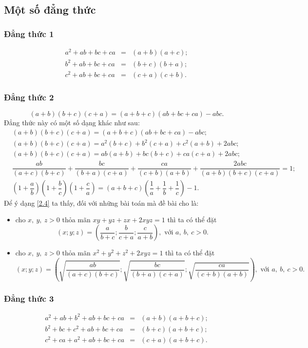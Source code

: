 {\subsection{Một số đẳng thức}
\subsubsection{Đẳng thức 1}
\begin{eqnarray*}
	a^{2}+ab+bc+ca&=&(a+b)(a+c);\\
	b^{2}+ab+bc+ca&=&(b+c)(b+a);\\
	c^{2}+ab+bc+ca&=&(c+a)(c+b).
\end{eqnarray*}
\subsubsection{Đẳng thức 2}
\[ 
(a+b)(b+c)(c+a)=(a+b+c)(ab+bc+ca)-abc.
\]
Đẳng thức này có một số dạng khác như sau:
\begin{align}
&(a+b)(b+c)(c+a)=(a+b+c)(ab+bc+ca)-abc;\tag{2.1}\\
&(a+b)(b+c)(c+a)=a^{2}(b+c)+b^{2}(c+a)+c^{2}(a+b)+2abc;\tag{2.2}\\
&(a+b)(b+c)(c+a)=ab(a+b)+bc(b+c)+ca(c+a)+2abc;\tag{2.3}\\
&\dfrac{ab}{(a+c)(b+c)}+\dfrac{bc}{(b+a)(c+a)}+\dfrac{ca}{(c+b)(a+b)}+\dfrac{2abc}{(a+b)(b+c)(c+a)}=1;\label{2.4}\tag{2.4}\\
&\left(1+\dfrac{a}{b}\right)\left(1+\dfrac{b}{c}\right)\left(1+\dfrac{c}{a}\right)=(a+b+c)\left(\dfrac{1}{a}+\dfrac{1}{b}+\dfrac{1}{c}\right)-1.\tag{2.5}
\end{align}
Để ý dạng \eqref{2.4} ta thấy, đối với những bài toán mà đề bài cho là:
\begin{itemize}
	\item cho $ x,\ y,\ z>0 $ thỏa mãn $ xy+yz+zx+2xyz=1 $ thì ta có thể đặt
	\[ 
	(x;y;z)=\left(\dfrac{a}{b+c};\dfrac{b}{c+a};\dfrac{c}{a+b}\right),\text{ với } a,\ b,\ c>0.
	\]
	\item cho $ x,\ y,\ z>0 $ thỏa mãn $ x^{2}+y^{2}+z^{2}+2xyz=1 $ thì ta có thể đặt
	\[ 
	(x;y;z)=\left(\sqrt{\dfrac{ab}{(a+c)(b+c)}};\sqrt{\dfrac{bc}{(b+a)(c+a)}};\sqrt{\dfrac{ca}{(c+b)(a+b)}}\right),\text{ với } a,\ b,\ c>0.
	\]
\end{itemize}
\subsubsection{Đẳng thức 3}
\begin{eqnarray*}
	a^{2}+ab+b^{2}+ab+bc+ca&=&(a+b)(a+b+c);\\
	b^{2}+bc+c^{2}+ab+bc+ca&=&(b+c)(a+b+c);\\
	c^{2}+ca+a^{2}+ab+bc+ca&=&(c+a)(a+b+c).
\end{eqnarray*}
}
